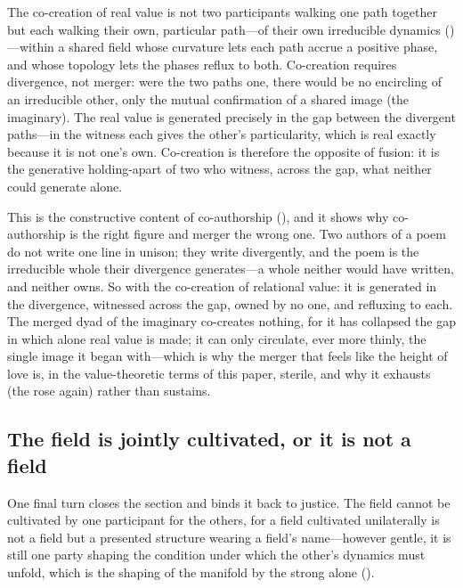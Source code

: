 \begin{claim}
The co-creation of real value is not two participants walking one path together but each walking their own, particular path---of their own irreducible dynamics ()---within a shared field whose curvature lets each path accrue a positive phase, and whose topology lets the phases reflux to both. Co-creation requires divergence, not merger: were the two paths one, there would be no encircling of an irreducible other, only the mutual confirmation of a shared image (the imaginary). The real value is generated precisely in the gap between the divergent paths---in the witness each gives the other's particularity, which is real exactly because it is not one's own. Co-creation is therefore the opposite of fusion: it is the generative holding-apart of two who witness, across the gap, what neither could generate alone.
\end{claim}

This is the constructive content of co-authorship (), and it shows why co-authorship is the right figure and merger the wrong one. Two authors of a poem do not write one line in unison; they write divergently, and the poem is the irreducible whole their divergence generates---a whole neither would have written, and neither owns. So with the co-creation of relational value: it is generated in the divergence, witnessed across the gap, owned by no one, and refluxing to each. The merged dyad of the imaginary co-creates nothing, for it has collapsed the gap in which alone real value is made; it can only circulate, ever more thinly, the single image it began with---which is why the merger that feels like the height of love is, in the value-theoretic terms of this paper, sterile, and why it exhausts (the rose again) rather than sustains.

\subsection{The field is jointly cultivated, or it is not a field}
\label{p09:sec:joint-cultivation}

One final turn closes the section and binds it back to justice. The field cannot be cultivated by one participant for the others, for a field cultivated unilaterally is not a field but a presented structure wearing a field's name---however gentle, it is still one party shaping the condition under which the other's dynamics must unfold, which is the shaping of the manifold by the strong alone ().


